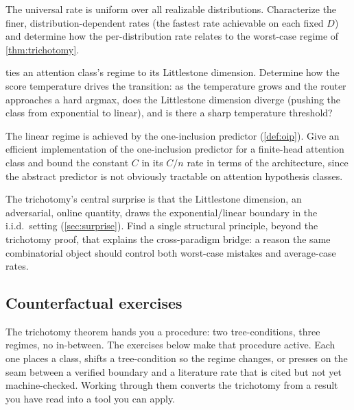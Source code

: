 \begin{openprob}
\label{op:adaptive-rates}
The universal rate is uniform over all realizable distributions.  Characterize the finer, distribution-dependent rates (the fastest rate achievable on each fixed $D$) and determine how the per-distribution rate relates to the worst-case regime of \cref{thm:trichotomy}.
\end{openprob}

\begin{openprob}
\label{op:attention-temperature-rate}
 ties an attention class's regime to its Littlestone dimension.  Determine how the score temperature drives the transition: as the temperature grows and the router approaches a hard argmax, does the Littlestone dimension diverge (pushing the class from exponential to linear), and is there a sharp temperature threshold?
\end{openprob}

\begin{openprob}
\label{op:oneinclusion-attention}
The linear regime is achieved by the one-inclusion predictor (\cref{def:oip}).  Give an efficient implementation of the one-inclusion predictor for a finite-head attention class and bound the constant $C$ in its $C/n$ rate in terms of the architecture, since the abstract predictor is not obviously tractable on attention hypothesis classes.
\end{openprob}

\begin{openprob}
\label{op:universal-online-bridge}
The trichotomy's central surprise is that the Littlestone dimension, an adversarial, online quantity, draws the exponential/linear boundary in the i.i.d.\ setting (\cref{sec:surprise}).  Find a single structural principle, beyond the trichotomy proof, that explains the cross-paradigm bridge: a reason the same combinatorial object should control both worst-case mistakes and average-case rates.
\end{openprob}


\subsection*{Counterfactual exercises}

The trichotomy theorem hands you a procedure: two tree-conditions, three
regimes, no in-between.  The exercises below make that procedure active.
Each one places a class, shifts a tree-condition so the regime changes,
or presses on the seam between a verified boundary and a literature rate
that is cited but not yet machine-checked.  Working through them converts
the trichotomy from a result you have read into a tool you can apply.

